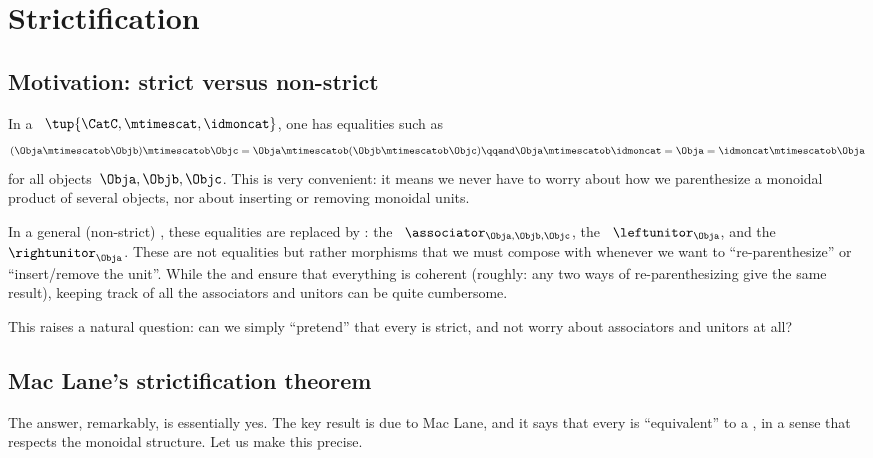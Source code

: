 
\section{Strictification}
\label{sec:strictification}


\subsection{Motivation: strict versus non-strict}

In a ~$\tup{\CatC, \mtimescat, \idmoncat}$, one has equalities such as
\begin{equation}
    (\Obja \mtimescatob \Objb) \mtimescatob \Objc = \Obja \mtimescatob (\Objb \mtimescatob \Objc) \qqand \Obja \mtimescatob \idmoncat = \Obja = \idmoncat \mtimescatob \Obja
\end{equation}
for all objects~$\Obja, \Objb, \Objc$.
This is very convenient: it means we never have to worry about how we parenthesize a monoidal product of several objects, nor about inserting or removing monoidal units.

In a general (non-strict) , these equalities are replaced by : the ~$\associator_{\Obja,\Objb,\Objc}$, the ~$\leftunitor_\Obja$, and the ~$\rightunitor_\Obja$.
These are not equalities but rather morphisms that we must compose with whenever we want to ``re-parenthesize'' or ``insert/remove the unit''.
While the  and  ensure that everything is coherent (roughly: any two ways of re-parenthesizing give the same result), keeping track of all the associators and unitors can be quite cumbersome.

This raises a natural question: can we simply ``pretend'' that every  is strict, and not worry about associators and unitors at all?

\subsection{Mac Lane's strictification theorem}

The answer, remarkably, is essentially yes.
The key result is due to Mac Lane, and it says that every  is ``equivalent'' to a , in a sense that respects the monoidal structure.
Let us make this precise.

